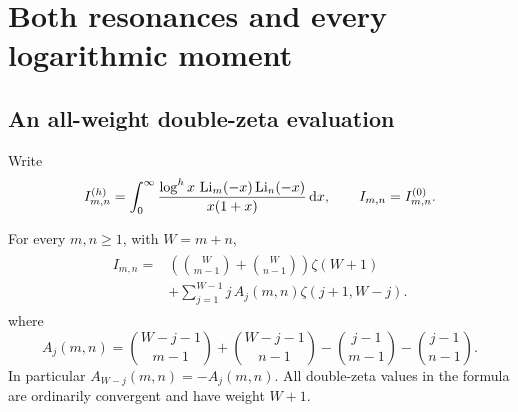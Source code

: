 \section{Both resonances and every logarithmic moment}\label{bmh:sec:resonances}

\subsection{An all-weight double-zeta evaluation}
Write
\begin{equation}\label{bmh:eq:Idef}
 I_{m,n}^{(h)}=\int_0^\infty
 \frac{\log^h x\,\operatorname{Li}_m(-x)\operatorname{Li}_n(-x)}{x(1+x)}\,\mathrm d x,
 \qquad I_{m,n}=I_{m,n}^{(0)}.
\end{equation}

\begin{theorem}\label{bmh:thm:compact}
For every $m,n\ge1$, with $W=m+n$,
\begin{align}
 \boxed{\begin{aligned}
 I_{m,n}={}&\left(\binom W{m-1}+\binom W{n-1}\right)\zeta(W+1)\\
 &+\sum_{j=1}^{W-1}j\,A_j(m,n)\zeta(j+1,W-j).
 \end{aligned}}
 \label{bmh:eq:compact}
\end{align}
where
\begin{equation}\label{bmh:eq:Aj}
 A_j(m,n)=\binom{W-j-1}{m-1}+\binom{W-j-1}{n-1}
           -\binom{j-1}{m-1}-\binom{j-1}{n-1}.
\end{equation}
In particular $A_{W-j}(m,n)=-A_j(m,n)$. All double-zeta values in the
formula are ordinarily convergent and have weight $W+1$.
\end{theorem}

